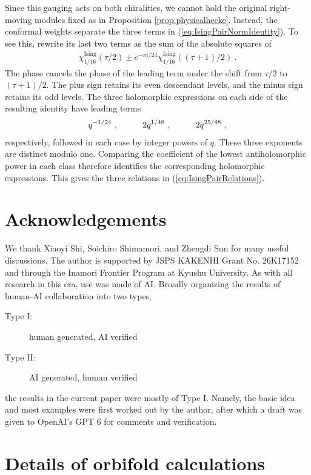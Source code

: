 \documentclass[12pt]{article}
\numberwithin{equation}{section}
\newcommand{\bea}{\begin{eqnarray}}
\newcommand{\eea}{\end{eqnarray}}
\theoremstyle{remark}
\begin{document}
Since this gauging acts on both chiralities, we cannot hold the original right-moving modules fixed as in Proposition \ref{prop:physicalhecke}. Instead, the conformal weights separate the three terms in (\ref{eq:IsingPairNormIdentity}). To see this, rewrite its last two terms as the sum of the absolute squares of
\bea 
\chi^{\mathrm{Ising}}_{1/16}(\tau/2)
\mathbin{\pm}e^{-\pi i/24}\chi^{\mathrm{Ising}}_{1/16}((\tau+1)/2)~.
\eea
The phase cancels the phase of the leading term under the shift from $\tau/2$ to $(\tau+1)/2$. The plus sign retains its even descendant levels, and the minus sign retains its odd levels. The three holomorphic expressions on each side of the resulting identity have leading terms
\bea
q^{-1/24}~,
\hspace{0.4 in}2q^{1/48}~,
\hspace{0.4 in}2q^{25/48}~,
\eea
respectively, followed in each case by integer powers of $q$. These three exponents are distinct modulo one. Comparing the coefficient of the lowest antiholomorphic power in each class therefore identifies the corresponding holomorphic expressions. This gives the three relations in (\ref{eq:IsingPairRelations}).



\section*{Acknowledgements}

We thank Xiaoyi Shi, Soichiro Shimamori, and Zhengdi Sun for many useful discussions. The author is supported by JSPS KAKENHI Grant No. 26K17152 and through the Inamori Frontier Program at Kyushu University. As with all research in this era, use was made of AI. Broadly organizing the results of human-AI collaboration into two types,
\begin{description}
\item[  Type I:]  human generated, AI verified
\item[  Type II:]  AI generated, human verified 
\end{description}
the results in the current paper were mostly of Type I. Namely, the basic idea and most examples were first worked out by the author, after which a draft was given to OpenAI's GPT 6 for comments and verification. 


\appendix

\section{Details of orbifold calculations}
\label{app:OrbifoldCalculations}
\end{document}
